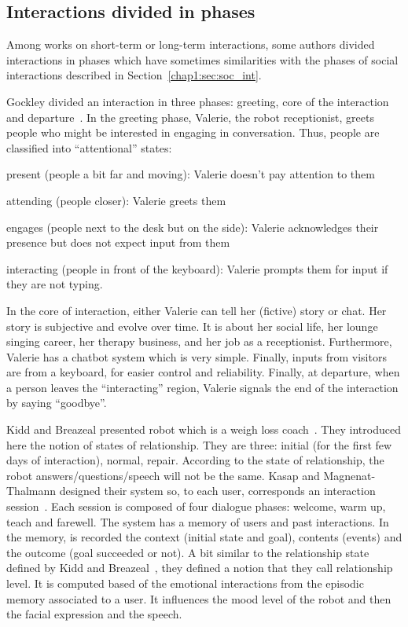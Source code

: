 \documentclass[a4paper,11pt,twoside]{StyleThese}
\begin{document}
\subsection{Interactions divided in phases}\label{chap1:subsec:inter_div}
Among works on short-term or long-term interactions, some authors divided interactions in phases which have sometimes similarities with the phases of social interactions described in Section~\ref{chap1:sec:soc_int}.

Gockley \etal{} divided an interaction in three phases: greeting, core of the interaction and departure~\cite{gockley_2005_designing}. In the greeting phase, Valerie, the robot receptionist, greets people who might be interested in engaging in conversation. Thus, people are classified into ``attentional'' states:
\begin{bulletList}
	\item present (people a bit far and moving): Valerie doesn’t pay attention to them
	\item attending (people closer): Valerie greets them
	\item engages (people next to the desk but on the side): Valerie acknowledges their presence but does not expect input from them
	\item interacting (people in front of the keyboard): Valerie prompts them for input if they are not typing.
\end{bulletList}
In the core of interaction, either Valerie can tell her (fictive) story or chat. Her story is subjective and evolve over time. It is about her social life, her lounge singing career, her therapy business, and her job as a receptionist. Furthermore, Valerie has a chatbot system which is very simple. Finally, inputs from visitors are from a keyboard, for easier control and reliability. Finally, at departure, when a person leaves the ``interacting'' region, Valerie signals the end of the interaction by saying ``goodbye''. 

Kidd and Breazeal presented robot which is a weigh loss coach~\cite{kidd_2008_robots}. They introduced here the notion of states of relationship. They are three: initial (for the first few days of interaction), normal, repair. According to the state of relationship, the robot answers/questions/speech will not be the same. Kasap and Magnenat-Thalmann designed their system so, to each user, corresponds an interaction session~\cite{kasap_2012_building}. Each session is composed of four dialogue phases: welcome, warm up, teach and farewell. The system has a memory of users and past interactions. In the memory, is recorded the context (initial state and goal), contents (events) and the outcome (goal succeeded or not). A bit similar to the relationship state defined by Kidd and Breazeal~\cite{kidd_2008_robots}, they defined a notion that they call relationship level. It is computed based of the emotional interactions from the episodic memory associated to a user. It influences the mood level of the robot and then the facial expression and the speech.
\end{document}
